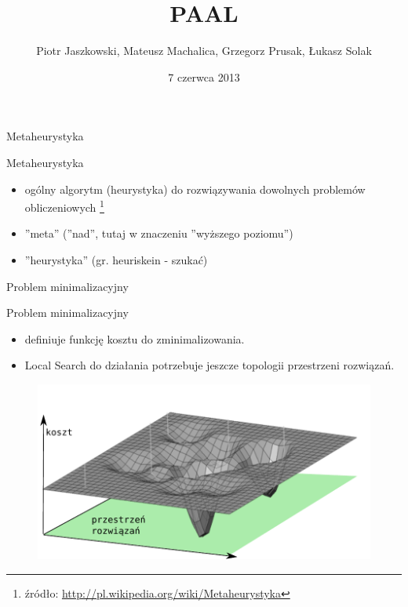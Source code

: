 \documentclass[blue]{beamer}
\title{PAAL}
\author{Piotr Jaszkowski, Mateusz Machalica, Grzegorz Prusak, Łukasz Solak}
\date{7 czerwca 2013}
\begin{document}

\begin{frame}
\titlepage
\end{frame}

\begin{frame}{Metaheurystyka}
\begin{block}{Metaheurystyka}
\begin{itemize}
\item ogólny algorytm (heurystyka) do rozwiązywania dowolnych problemów obliczeniowych
	\footnote{źródło: \url{http://pl.wikipedia.org/wiki/Metaheurystyka}}
\item ''meta'' (''nad'', tutaj w znaczeniu ''wyższego poziomu'')
\item ''heurystyka'' (gr. heuriskein - szukać)
\end{itemize}
\end{block}
\end{frame}

\begin{frame}{Problem minimalizacyjny}
\begin{block}{Problem minimalizacyjny}
\begin{itemize}
\item definiuje funkcję kosztu do zminimalizowania.
\item Local Search do działania potrzebuje jeszcze topologii przestrzeni rozwiązań.
\end{itemize}
\end{block}
\begin{figure}
\includegraphics[scale=.7]{ss1.pdf}
\end{figure}
\end{frame}
\end{document}
